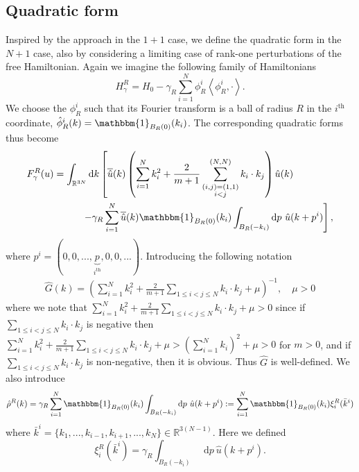 \documentclass[a4paper,11pt]{article}
\renewcommand{\braket}[1]{\left\langle#1\right\rangle}
\newcommand*\diff{\mathop{}\!\mathrm{d}}
\newcommand{\R}{\mathbb{R}}
\numberwithin{equation}{section}
\begin{document}
\subsection{Quadratic form}
Inspired by the approach in the $ 1+1 $ case, we define the quadratic form in the $ N+1 $ case, also by considering a limiting case of rank-one perturbations of the free Hamiltonian. Again we imagine the following family of Hamiltonians\begin{equation}
H_\gamma^R=H_0-\gamma_R\sum_{i=1}^{N}\phi^i_R\braket{\phi^i_R,\cdot}.
\end{equation}
We choose the $ \phi^i_R $ such that its Fourier transform is a ball of radius $ R $ in the $ i^{\text{th}} $ coordinate, $ \hat{\phi}^i_R(k)=\mathbbm{1}_{B_R(0)}(k_i) $. The corresponding quadratic forms thus become\begin{equation}\label{F at Finite R}
\begin{aligned}
F_\gamma^R(u)=\int_{\R^{3N}}\diff k \left[\overline{\hat{u}}(k)\left(\sum_{i=1}^{N}k_i^2+\frac{2}{m+1}\sum_{\substack{(i,j)=(1,1)\\i<j}}^{(N,N)}k_i\cdot k_j\right)\hat{u}(k)\qquad\qquad\right.\\\left.-\gamma_R\sum_{i=1}^{N}\overline{\hat{u}}(k)\mathbbm{1}_{B_R(0)}(k_i)\int_{B_R(-k_i)}\diff p\ \hat{u}(k+p^i)\right],
\end{aligned}
\end{equation}
where $ p^i=(0,0,...,\underbrace{p}_{i^\text{th}},0,0,...) $. Introducing the following notation\begin{equation}
\begin{aligned}
\hat{G}(k)=\left(\sum_{i=1}^{N}k_i^2+\frac{2}{m+1}\sum_{1\leq i<j\leq N}k_i\cdot k_j+\mu\right)^{-1},\quad \mu>0
\end{aligned}
\end{equation}
where we note that $ \sum_{i=1}^{N}k_i^2+\frac{2}{m+1}\sum_{1\leq i<j\leq N}k_i\cdot k_j+\mu>0 $ since if $ \sum_{1\leq i<j\leq N}k_i\cdot k_j $ is negative then $ \sum_{i=1}^{N}k_i^2+\frac{2}{m+1}\sum_{1\leq i<j\leq N}k_i\cdot k_j+\mu>(\sum_{i=1}^{N}k_i)^2+\mu>0 $ for $ m>0 $, and if $ \sum_{1\leq i<j\leq N}k_i\cdot k_j $ is non-negative, then it is obvious. Thus $ \hat{G} $ is well-defined. We also introduce \begin{equation}
\hat{\rho}^R(k)=\gamma_R\sum_{i=1}^{N}\mathbbm{1}_{B_R(0)}(k_i)\int_{B_R(-k_i)}\diff p\ \hat{u}(k+p^i):=\sum_{i=1}^{N}\mathbbm{1}_{B_R(0)}(k_i)\xi_i^R(\bar{k}^i)
\end{equation}
where $ \bar{k}^i=\{k_1,...,k_{i-1},k_{i+1},...,k_N\}\in\R^{3(N-1)} $. Here we defined \begin{equation}
\xi^R_i(\bar{k}^i)=\gamma_R\int_{B_R(-k_i)}\diff p\ \hat{u}(k+p^i).
\end{equation}
\end{document}
